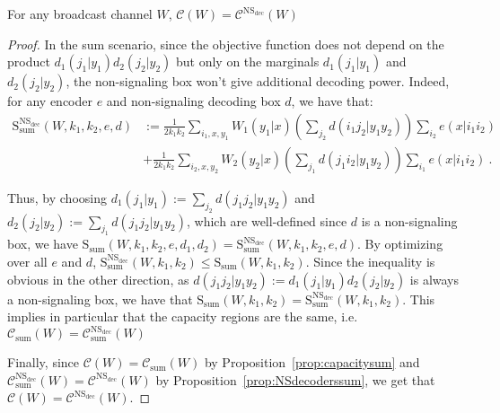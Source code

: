 \begin{theorem}
    \label{theo:NSdecoders}
   For any broadcast channel $W$, $\mathcal{C}(W) = \mathcal{C}^{\mathrm{NS}_{\text{dec}}}(W)$
\end{theorem}

\begin{proof}
In the sum scenario, since the objective function does not depend on the product $d_1(j_1|y_1)d_2(j_2|y_2)$ but only on the marginals $d_1(j_1|y_1)$ and $d_2(j_2|y_2)$, the non-signaling box won't give additional decoding power. Indeed, for any encoder $e$ and non-signaling decoding box $d$, we have that:
\begin{equation}
  \begin{aligned}
    \mathrm{S}_{\text{sum}}^{\mathrm{NS}_{\text{dec}}}(W,k_1,k_2,e,d) &:= \frac{1}{2k_1k_2}\sum_{i_1,x,y_1} W_1(y_1|x)\left(\sum_{j_2}d(i_1j_2|y_1y_2)\right)\sum_{i_2} e(x|i_1i_2)\\
    &+ \frac{1}{2k_1k_2} \sum_{i_2,x,y_2} W_2(y_2|x)\left(\sum_{j_1}d(j_1i_2|y_1y_2)\right)\sum_{i_1} e(x|i_1i_2) \ .
  \end{aligned}
\end{equation}

Thus, by choosing $d_1(j_1|y_1) := \sum_{j_2}d(j_1j_2|y_1y_2)$ and $d_2(j_2|y_2) := \sum_{j_1}d(j_1j_2|y_1y_2)$, which are well-defined since $d$ is a non-signaling box, we have $\mathrm{S}_{\text{sum}}(W,k_1,k_2,e,d_1,d_2) = \mathrm{S}_{\text{sum}}^{\mathrm{NS}_{\text{dec}}}(W,k_1,k_2,e,d)$. By optimizing over all $e$ and $d$, $\mathrm{S}_{\text{sum}}^{\mathrm{NS}_{\text{dec}}}(W,k_1,k_2) \leq \mathrm{S}_{\text{sum}}(W,k_1,k_2)$. Since the inequality is obvious in the other direction, as $d(j_1j_2|y_1y_2) := d_1(j_1|y_1)d_2(j_2|y_2)$ is always a non-signaling box, we have that $\mathrm{S}_{\text{sum}}(W,k_1,k_2)=\mathrm{S}_{\text{sum}}^{\mathrm{NS}_{\text{dec}}}(W,k_1,k_2)$. This implies in particular that the capacity regions are the same, i.e. $\mathcal{C}_{\text{sum}}(W)=\mathcal{C}_{\text{sum}}^{\mathrm{NS}_{\text{dec}}}(W)$

Finally, since $\mathcal{C}(W) = \mathcal{C}_{\text{sum}}(W)$ by Proposition~\ref{prop:capacitysum} and $\mathcal{C}_{\text{sum}}^{\mathrm{NS}_{\text{dec}}}(W)= \mathcal{C}^{\mathrm{NS}_{\text{dec}}}(W)$ by Proposition~\ref{prop:NSdecoderssum}, we get that $\mathcal{C}(W) = \mathcal{C}^{\mathrm{NS}_{\text{dec}}}(W)$.
\end{proof}

